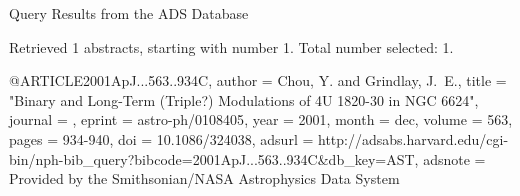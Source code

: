 Query Results from the ADS Database


Retrieved 1 abstracts, starting with number 1.  Total number selected: 1.

@ARTICLE{2001ApJ...563..934C,
   author = {{Chou}, Y. and {Grindlay}, J.~E.},
    title = "{Binary and Long-Term (Triple?) Modulations of 4U 1820-30 in NGC 6624}",
  journal = {\apj},
   eprint = {astro-ph/0108405},
     year = 2001,
    month = dec,
   volume = 563,
    pages = {934-940},
      doi = {10.1086/324038},
   adsurl = {http://adsabs.harvard.edu/cgi-bin/nph-bib_query?bibcode=2001ApJ...563..934C&db_key=AST},
  adsnote = {Provided by the Smithsonian/NASA Astrophysics Data System}
}



